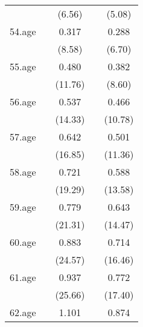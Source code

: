 {\begin{tabular}{l*{4}{c}}
            &                     &      (6.56)         &                     &      (5.08)         \\
[1em]
54.age      &                     &       0.317\sym{***}&                     &       0.288\sym{***}\\
            &                     &      (8.58)         &                     &      (6.70)         \\
[1em]
55.age      &                     &       0.480\sym{***}&                     &       0.382\sym{***}\\
            &                     &     (11.76)         &                     &      (8.60)         \\
[1em]
56.age      &                     &       0.537\sym{***}&                     &       0.466\sym{***}\\
            &                     &     (14.33)         &                     &     (10.78)         \\
[1em]
57.age      &                     &       0.642\sym{***}&                     &       0.501\sym{***}\\
            &                     &     (16.85)         &                     &     (11.36)         \\
[1em]
58.age      &                     &       0.721\sym{***}&                     &       0.588\sym{***}\\
            &                     &     (19.29)         &                     &     (13.58)         \\
[1em]
59.age      &                     &       0.779\sym{***}&                     &       0.643\sym{***}\\
            &                     &     (21.31)         &                     &     (14.47)         \\
[1em]
60.age      &                     &       0.883\sym{***}&                     &       0.714\sym{***}\\
            &                     &     (24.57)         &                     &     (16.46)         \\
[1em]
61.age      &                     &       0.937\sym{***}&                     &       0.772\sym{***}\\
            &                     &     (25.66)         &                     &     (17.40)         \\
[1em]
62.age      &                     &       1.101\sym{***}&                     &       0.874\sym{***}\\

\end{tabular}}
